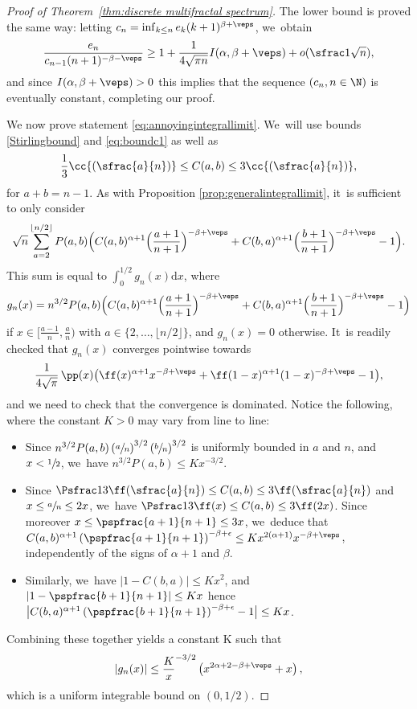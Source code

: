 \begin{proof}[Proof of Theorem~\ref{thm:discrete multifractal spectrum}]
The lower bound is proved the same way: letting $c_n=\inf_{k\leq n}e_k (k+1)^{\beta+\veps}$, we~obtain\vspace*{-3pt}
\[
\frac{e_n}{c_{n-1}(n+1)^{-\beta-\veps}} \geq 1 + \frac1{4\sqrt{\pi n}}I(\alpha,\beta+\veps) + o(\sfrac1{\sqrt{n}}),
\]
and since $I(\alpha,\beta+\veps)>0$ this implies that the sequence $(c_n,n\in\N)$ is eventually constant, completing our proof.

We now prove statement \eqref{eq:annoyingintegrallimit}. We~will use bounds \eqref{Stirlingbound} and \eqref{eq:boundc1} as well as\vspace*{-3pt}
\[
\frac1{3} \cc{\left(\sfrac{a}{n}\right)}\leq C(a,b)\leq 3 \cc{(\sfrac{a}{n})},
\]
for $a+b=n-1$. As with Proposition \ref{prop:generalintegrallimit}, it~is sufficient to only consider\vspace*{-3pt}
\[
\sqrt{n}\sum_{a=2}^{\lfloor n/2 \rfloor}P(a,b)\Bigl(C(a,b)^{\alpha+1}\Bigl(\frac{a+1}{n+1}\Bigr)^{-\beta+\veps}+C(b,a)^{\alpha+1}\Bigl(\frac{b+1}{n+1}\Bigr)^{-\beta+\veps}-1\Bigr).
\]
This sum is equal to $\int_0^{1/2} g_n(x)\mathrm{d}x$, where\vspace*{-3pt}
\[
g_n(x)= n^{3/2}P(a,b)\Bigl(C(a,b)^{\alpha+1}\Bigl(\frac{a+1}{n+1}\Bigr)^{-\beta+\veps}+C(b,a)^{\alpha+1}\Bigl(\frac{b+1}{n+1}\Bigr)^{-\beta+\veps}-1\Bigr)
\]
if $x\in[\frac{a-1}{n},\frac{a}{n})$ with $a\in \{2,\ldots,\lfloor n/2 \rfloor\}$, and $g_n(x)=0$ otherwise. It~is readily checked that $g_n(x)$ converges pointwise towards\vspace*{-3pt}
\[
\frac{1}{4\sqrt{\pi}}\, \pp(x)\bigl(\ff(x)^{\alpha+1} x^{-\beta+\veps}+\ff(1-x)^{\alpha+1} (1-x)^{-\beta+\veps}-1\bigr),
\]
and we need to check that the convergence is dominated. Notice the following, where the constant $K>0$ may vary from line to line:
\begin{itemize}
\item Since $n^{3/2} P(a,b)\left(\sfrac{a}{n}\right)^{3/2}\left(\sfrac{b}{n}\right)^{3/2}$ is uniformly bounded in $a$ and $n$, and $x<\sfrac{1}{2}$, we~have $n^{3/2}P(a,b)\leq K x^{-3/2}$.
\item Since $\Psfrac1{3}\ff(\sfrac{a}{n})\leq C(a,b)\leq 3\ff(\sfrac{a}{n})$ and $x\leq \sfrac{a}{n}\leq 2x$, we~have $\Psfrac1{3}\ff(x)\leq C(a,b)\leq 3\ff(2x)$. Since moreover $x\leq\pspfrac{a+1}{n+1}\leq 3x$, we~deduce that $C(a,b)^{\alpha+1} \left(\pspfrac{a+1}{n+1}\right)^{-\beta+\epsilon}\leq K x^{2(\alpha+1)}x^{-\beta+\veps}$, independently of the signs of $\alpha+1$ and $\beta$.
\item Similarly, we~have $|1-C(b,a)|\leq Kx^2$, and $\left|1-\pspfrac{b+1}{n+1}\right|\leq Kx$ hence $\bigl|C(b,a)^{\alpha+1}\left(\pspfrac{b+1}{n+1}\right)^{-\beta+\epsilon}-1\bigr| \leq K x$.
\end{itemize}

Combining these together yields a constant K such that
\[
|g_n(x)|\leq \frac{K}x^{-3/2}\left(x^{2\alpha+2-\beta+\veps}+x\right),
\]
which is a uniform integrable bound on $(0,1/2)$.
\end{proof}

